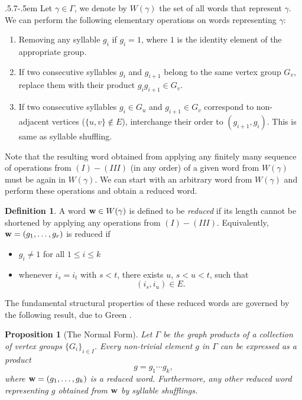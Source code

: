 \documentclass[11pt,reqno]{amsart}
\makeatletter
\numberwithin{equation}{section} %
\newtheorem{prop}{Proposition}
\theoremstyle{definition}
\newtheorem{defn}{Definition}
\theoremstyle{remark}
\numberwithin{equation}{section}
\def\subsection{\def\@secnumfont{\bfseries}\@startsection{subsection}{2}%
  {\parindent}{.5\linespacing\@plus.7\linespacing}{-.5em}%
  {\normalfont\bfseries}}
\makeatother
\begin{document}
\subsection{}
Let $\gamma\in \Gamma$, we denote by $W(\gamma)$ %
the set of all words that represent $\gamma. $ We can perform the following elementary operations
on words representing $\gamma$:
\begin{enumerate}
    \item[(I)] Removing any syllable $g_i$ if $g_i = 1$, where $1$ is the identity element of the appropriate group. 
    \item[(II)] If two consecutive syllables $g_i$ 
    and $g_{i+1}$ belong to the same vertex group $G_v$, replace them with their 
    product $g_i g_{i+1} \in G_v$.
    \item[(III)]  If two consecutive syllables $g_i \in G_u$ 
    and $g_{i+1} \in G_v$ correspond to non-adjacent vertices ($\{u, v\} \notin E$), 
    interchange their order to $(g_{i+1}, g_i)$. This is same as syllable shuffling.
\end{enumerate}
Note that the resulting word obtained from applying any 
finitely many sequence of operations from $(I) - (III)$ (in any order) of a given word from $W(\gamma)$ must be again in $W(\gamma)$. We can start with an arbitrary word from $W(\gamma)$ and perform these operations and obtain 
a reduced word.
\begin{defn}
    A word $\bold w\in W(\gamma)$ is defined to be \emph{reduced} if its length cannot be shortened by applying any 
 operations from $(I) - (III)$.
Equivalently, $\bold w = (g_1, \dots, g_r)$ is reduced if 
\begin{itemize}
    \item $g_i\neq 1$ for all $1\le i\le k$
    \item whenever $i_s = i_t$ with $s < t$, there exists $u$, $s < u < t$, such that
\begin{equation*}
(i_s, i_u) \in E.
\end{equation*}
\end{itemize}
\end{defn}


The fundamental structural properties of these reduced words are governed 
by the following result, due to Green \cite{Green}.

\begin{prop}[The Normal Form]
Let $\Gamma$ be the graph products of a collection of vertex groups 
$\{G_i\}_{i\in I}$. Every non-trivial element $g$ in $\Gamma$ can be 
expressed as a product $$g = g_1 \cdots g_k,$$ where $\bold w = (g_1, \dots, g_k)$ 
is a reduced word. Furthermore, any other reduced word representing $g$ obtained from $\bold w$
by syllable shufflings.

\end{prop}    
\end{document}
